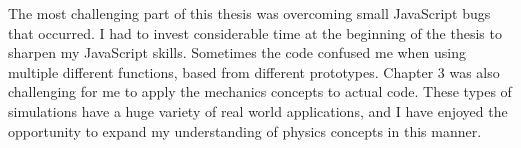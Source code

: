 The most challenging part of this thesis was overcoming small JavaScript bugs that occurred.  I had to invest considerable time at the beginning of the thesis to sharpen my JavaScript skills.  Sometimes the code confused me when using multiple different functions, based from different prototypes.  Chapter 3 was also challenging for me to apply the mechanics concepts to actual code.  These types of simulations have a huge variety of real world applications, and I have enjoyed the opportunity to expand my understanding of physics concepts in this manner.

































